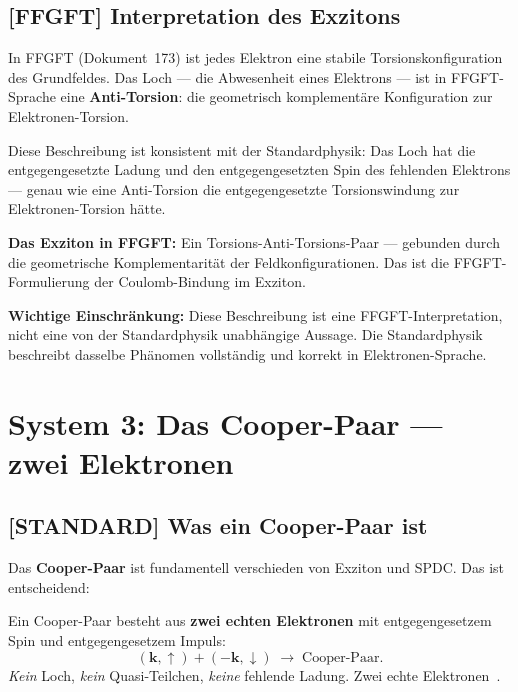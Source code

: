 \subsection{[FFGFT] Interpretation des Exzitons}

\begin{foundation}
In FFGFT (Dokument~173) ist jedes Elektron eine
stabile Torsionskonfiguration des Grundfeldes.
Das Loch --- die Abwesenheit eines Elektrons --- ist
in FFGFT-Sprache eine \textbf{Anti-Torsion}:
die geometrisch komplementäre Konfiguration zur Elektronen-Torsion.

Diese Beschreibung ist konsistent mit der Standardphysik:
Das Loch hat die entgegengesetzte Ladung und den
entgegengesetzten Spin des fehlenden Elektrons ---
genau wie eine Anti-Torsion die entgegengesetzte
Torsionswindung zur Elektronen-Torsion hätte.

\textbf{Das Exziton in FFGFT:}
Ein Torsions-Anti-Torsions-Paar --- gebunden durch
die geometrische Komplementarität der Feldkonfigurationen.
Das ist die FFGFT-Formulierung der Coulomb-Bindung im Exziton.

\textbf{Wichtige Einschränkung:}
Diese Beschreibung ist eine FFGFT-Interpretation,
nicht eine von der Standardphysik unabhängige Aussage.
Die Standardphysik beschreibt dasselbe Phänomen vollständig
und korrekt in Elektronen-Sprache.
\end{foundation}

\section{System 3: Das Cooper-Paar --- zwei Elektronen}
\label{sec:cooper}

\subsection{[STANDARD] Was ein Cooper-Paar ist}

Das \textbf{Cooper-Paar} ist fundamentell verschieden
von Exziton und SPDC. Das ist entscheidend:

\begin{keyresult}[STANDARD: Cooper-Paar = zwei echte Elektronen]
Ein Cooper-Paar besteht aus \textbf{zwei echten Elektronen}
mit entgegengesetzem Spin und entgegengesetzem Impuls:
\begin{equation}
  (\mathbf{k}, \uparrow) + (-\mathbf{k}, \downarrow)
  \;\longrightarrow\; \text{Cooper-Paar}.
\end{equation}
\textit{Kein} Loch, \textit{kein} Quasi-Teilchen, \textit{keine} fehlende Ladung.
Zwei echte Elektronen~\cite{Cooper1956,BCS1957}.
\end{keyresult}

